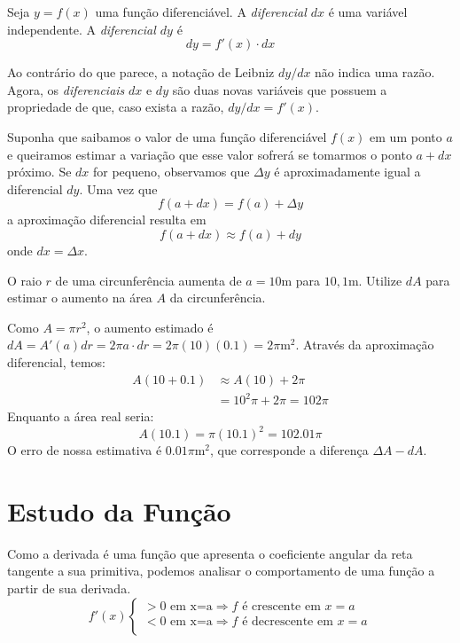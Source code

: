 \begin{df}
Seja $y=f(x)$ uma função diferenciável. A \emph{diferencial $dx$} é uma variável independente. A \emph{diferencial $dy$} é \[dy=f'(x) \cdot dx\]
\end{df}
Ao contrário do que parece, a notação de Leibniz $dy/dx$ não indica uma razão. Agora, os \emph{diferenciais} $dx$ e $dy$ são duas novas variáveis que possuem a propriedade de que, caso exista a razão, $dy/dx=f'(x)$. \par 
Suponha que saibamos o valor de uma função diferenciável $f(x)$ em um ponto $a$ e queiramos estimar a variação que esse valor sofrerá se tomarmos o ponto $a+dx$ próximo. Se $dx$ for pequeno, observamos que $\Delta y$ é aproximadamente igual a diferencial $dy$. Uma vez que \[f(a+dx)=f(a)+\Delta y\] a aproximação diferencial resulta em \[f(a+dx) \approx f(a) + dy\] onde $dx=\Delta x$. 
\begin{exemplo}
O raio $r$ de uma circunferência aumenta de $a=10$m para $10,1$m. Utilize $dA$ para estimar o aumento na área $A$ da circunferência. \par Como $A=\pi r^2$, o aumento estimado é $dA=A'(a)dr=2\pi a\cdot  dr=2\pi (10)(0.1)=2\pi$m$^2$. Através da aproximação diferencial, temos:
\begin{align*}
A(10+0.1) &\approx A(10)+2\pi \\
&= 10^2\pi + 2\pi = 102\pi
\end{align*}
Enquanto a área real seria:
\[A(10.1)=\pi(10.1)^2=102.01\pi\]
O erro de nossa estimativa é $0.01\pi$m$^2$, que corresponde a diferença $\Delta A - dA$.
\end{exemplo}

\section{Estudo da Função}
Como a derivada é uma função que apresenta o coeficiente angular da reta tangente a sua primitiva, podemos analisar o comportamento de uma função a partir de sua derivada.
\[f'(x)\begin{cases}
>0 \textrm{ em x=a} \Rightarrow f\textrm{ é crescente em }x=a\\
<0 \textrm{ em x=a} \Rightarrow f\textrm{ é decrescente em }x=a\\
\end{cases}\]

